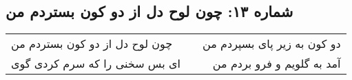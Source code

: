 \begin{center}
\section*{شماره ۱۳: چون لوح دل از دو کون بستردم من}
\label{sec:013}
\begin{longtable}{l p{0.5cm} r}
چون لوح دل از دو کون بستردم من
&&
دو کون به زیر پای بسپردم من
\\
ای بس سخنی را که سرم کردی گوی
&&
آمد به گلویم و فرو بردم من
\\
\end{longtable}
\end{center}
